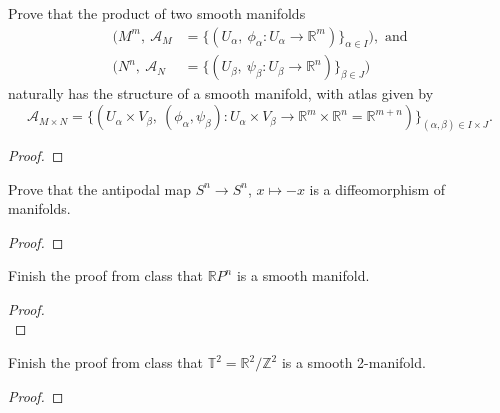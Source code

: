 \documentclass{article}
\newenvironment{problem}[2][Problem]{\begin{trivlist}
\item[\hskip \labelsep {\bfseries #1}\hskip \labelsep {\bfseries #2.}]}{\end{trivlist}}
\begin{document}
\pagebreak

\begin{problem}{3}
  Prove that the product of two smooth manifolds \begin{align*}
    (M^m,\ \mathcal{A}_M &= \{(U_\alpha,\ \phi_\alpha: U_\alpha \rightarrow \mathbb{R}^m)\}_{\alpha \in I}), \text{ and}\\
    (N^n,\ \mathcal{A}_N &= \{(U_\beta,\ \psi_\beta: U_\beta \rightarrow \mathbb{R}^n)\}_{\beta \in J})
  \end{align*}
  naturally has the structure of a smooth manifold, with atlas given by \[
    \mathcal{A}_{M\times N} = \{
      (U_\alpha \times V_\beta,\
      (\phi_\alpha, \psi_\beta):
        U_\alpha \times V_\beta \rightarrow
        \mathbb{R}^m \times \mathbb{R}^n = \mathbb{R}^{m + n})
    \}_{(\alpha, \beta) \in I \times J}.
  \]

\end{problem}

\begin{proof}
\end{proof}

\pagebreak

\begin{problem}{4}
  Prove that the antipodal map $S^n \rightarrow S^n$, $x \mapsto -x$ is a
  diffeomorphism of manifolds.
\end{problem}

\begin{proof}
\end{proof}

\pagebreak

\begin{problem}{5}
  Finish the proof from class that $\mathbb{R}P^n$ is a smooth manifold.
\end{problem}

\begin{proof} \text{} \\
\end{proof}

\pagebreak

\begin{problem}{6}
  Finish the proof from class that $\mathbb{T}^2 = \mathbb{R}^2/\mathbb{Z}^2$
  is a smooth 2-manifold.
\end{problem}

\begin{proof} \text{\\}
\end{proof}
\end{document}
